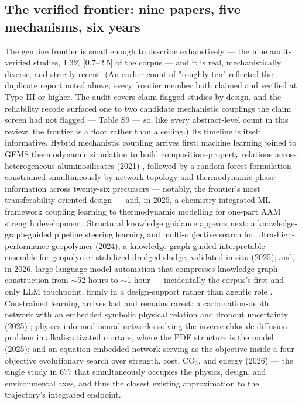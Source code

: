 \documentclass[pdflatex,sn-basic]{sn-jnl}
\begin{document}
\subsection{The verified frontier: nine papers, five mechanisms, six years}

The genuine frontier is small enough to describe exhaustively --- the nine audit-verified studies, 1.3\% [0.7--2.5] of the corpus --- and it is real, mechanistically diverse, and strictly recent. (An earlier count of "roughly ten" reflected the duplicate report noted above; every frontier member both claimed and verified at Type III or higher. The audit covers claim-flagged studies by design, and the reliability recode surfaced one to two candidate mechanistic couplings the claim screen had not flagged --- Table S9 --- so, like every abstract-level count in this review, the frontier is a floor rather than a ceiling.) Its timeline is itself informative. Hybrid mechanistic coupling arrives first: machine learning joined to GEMS thermodynamic simulation to build composition--property relations across heterogeneous aluminosilicates (2021) \citep{ke2021}, followed by a random-forest formulation constrained simultaneously by network-topology and thermodynamic phase information across twenty-six precursors --- notably, the frontier's most transferability-oriented design \citep{bhat2022} --- and, in 2025, a chemistry-integrated ML framework coupling learning to thermodynamic modelling for one-part AAM strength development. Structural knowledge guidance appears next: a knowledge-graph-guided pipeline steering learning and multi-objective search for ultra-high-performance geopolymer (2024); a knowledge-graph-guided interpretable ensemble for geopolymer-stabilized dredged sludge, validated in situ (2025); and, in 2026, large-language-model automation that compresses knowledge-graph construction from $\sim$52 hours to $\sim$1 hour --- incidentally the corpus's first and only LLM touchpoint, firmly in a design-support rather than agentic role \citep{jiang2026}. Constrained learning arrives last and remains rarest: a carbonation-depth network with an embedded symbolic physical relation and dropout uncertainty (2025) \citep{liu2025}; physics-informed neural networks solving the inverse chloride-diffusion problem in alkali-activated mortars, where the PDE structure is the model (2025); and an equation-embedded network serving as the objective inside a four-objective evolutionary search over strength, cost, CO$_2$, and energy (2026) \citep{guo2026} --- the single study in 677 that simultaneously occupies the physics, design, and environmental axes, and thus the closest existing approximation to the trajectory's integrated endpoint.
\end{document}

